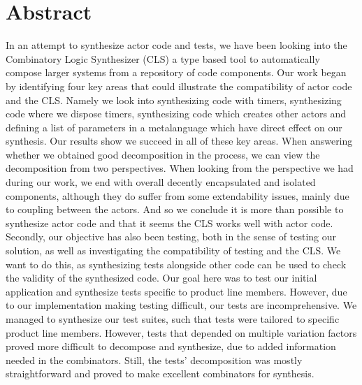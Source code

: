 \section{Abstract}
In an attempt to synthesize actor code and tests, we have been looking into the Combinatory Logic Synthesizer (CLS) a type based tool to automatically compose larger systems from a repository of code components. Our work began by identifying four key areas that could illustrate the compatibility of actor code and the CLS. Namely we look into synthesizing code with timers, synthesizing code where we dispose timers, synthesizing code which creates other actors and defining a list of parameters in a metalanguage which have direct effect on our synthesis. Our results show we succeed in all of these key areas. When answering whether we obtained good decomposition in the process, we can view the decomposition from two perspectives. When looking from the perspective we had during our work, we end with overall decently encapsulated and isolated components, although they do suffer from some extendability issues, mainly due to coupling between the actors. And so we conclude it is more than possible to synthesize actor code and that it seems the CLS works well with actor code.\\
Secondly, our objective has also been testing, both in the sense of testing our solution, as well as investigating the compatibility of testing and the CLS. We want to do this, as synthesizing tests alongside other code can be used to check the validity of the synthesized code. Our goal here was to test our initial application and synthesize tests specific to product line members. However, due to our implementation making testing difficult, our tests are incomprehensive. We managed to synthesize our test suites, such that tests were tailored to specific product line members. However, tests that depended on multiple variation factors proved more difficult to decompose and synthesize, due to added information needed in the combinators. Still, the tests' decomposition was mostly straightforward and proved to make excellent combinators for synthesis.

